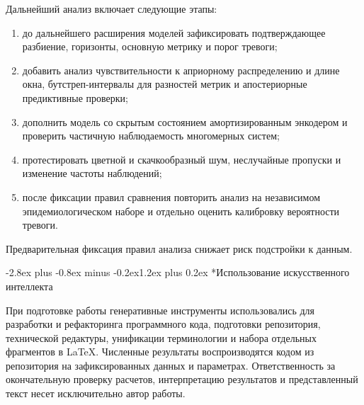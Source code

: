 \documentclass[12pt,a4paper]{article}
\makeatletter
\numberwithin{table}{section}
\numberwithin{figure}{section}
\renewcommand\section{\@startsection{section}{1}{0pt}
  {-2.8ex plus -0.8ex minus -0.2ex}{1.2ex plus 0.2ex}
  {\centering\normalfont\normalsize\bfseries}}
\makeatother
\begin{document}
Дальнейший анализ включает следующие этапы:

\begin{enumerate}
\item до дальнейшего расширения моделей зафиксировать подтверждающее разбиение,
горизонты, основную метрику и порог тревоги;
\item добавить анализ чувствительности к априорному распределению и длине окна,
бутстреп-интервалы для разностей метрик и апостериорные предиктивные проверки;
\item дополнить модель со скрытым состоянием амортизированным энкодером и
проверить частичную наблюдаемость многомерных систем;
\item протестировать цветной и скачкообразный шум, неслучайные пропуски и изменение
частоты наблюдений;
\item после фиксации правил сравнения повторить анализ на независимом
эпидемиологическом наборе и отдельно оценить калибровку вероятности тревоги.
\end{enumerate}

Предварительная фиксация правил анализа снижает риск подстройки к данным.

\clearpage
\section*{Использование искусственного интеллекта}

При подготовке работы генеративные инструменты использовались для разработки и
рефакторинга программного кода, подготовки репозитория, технической редактуры,
унификации терминологии и набора отдельных фрагментов в LaTeX. Численные
результаты воспроизводятся кодом из репозитория на зафиксированных данных и
параметрах. Ответственность
за окончательную проверку расчетов, интерпретацию результатов и представленный
текст несет исключительно автор работы.

\clearpage
\end{document}
